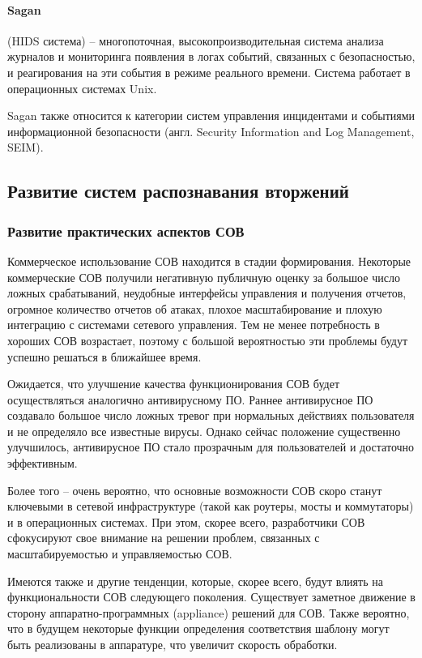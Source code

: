 \paragraph*{Sagan} (HIDS система) -- многопоточная, высокопроизводительная система 
анализа журналов и мониторинга появления в логах событий, связанных с безопасностью, 
и реагирования на эти события в режиме реального времени. Система работает в операционных 
системах Unix. 

Sagan также относится к категории систем управления инцидентами и событиями информационной 
безопасности (англ. Security Information and Log Management, SEIM).



\subsection{Развитие систем распознавания вторжений}

\subsubsection{Развитие практических аспектов СОВ}

Коммерческое использование СОВ находится в стадии формирования. Некоторые коммерческие 
СОВ получили негативную публичную оценку за большое число ложных срабатываний, неудобные 
интерфейсы управления и получения отчетов, огромное количество отчетов об атаках, 
плохое масштабирование и плохую интеграцию с системами сетевого управления. Тем не менее 
потребность в хороших СОВ возрастает, поэтому с большой вероятностью эти проблемы будут 
успешно решаться в ближайшее время.

Ожидается, что улучшение качества функционирования СОВ будет осуществляться аналогично 
антивирусному ПО. Раннее антивирусное ПО создавало большое число ложных тревог при 
нормальных действиях пользователя и не определяло все известные вирусы. Однако сейчас 
положение существенно улучшилось, антивирусное ПО стало прозрачным для пользователей 
и достаточно эффективным.

Более того – очень вероятно, что основные возможности СОВ скоро станут ключевыми в 
сетевой инфраструктуре (такой как роутеры, мосты и коммутаторы) и в операционных системах. 
При этом, скорее всего, разработчики СОВ сфокусируют свое внимание на решении проблем, 
связанных с масштабируемостью и управляемостью СОВ.

Имеются также и другие тенденции, которые, скорее всего, будут влиять на функциональности 
СОВ следующего поколения. Существует заметное движение в сторону аппаратно-программных 
(appliance) решений для СОВ. Также вероятно, что в будущем некоторые функции определения 
соответствия шаблону могут быть реализованы в аппаратуре, что увеличит скорость обработки.

